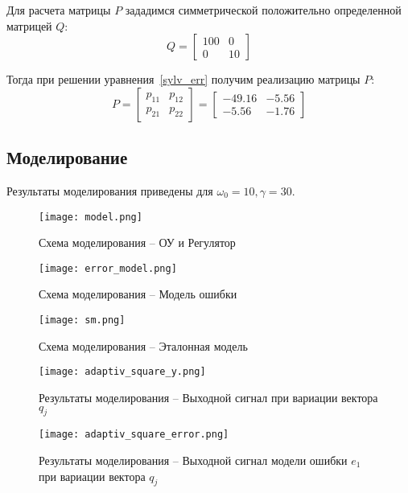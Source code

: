 Для расчета матрицы $P$ зададимся симметрической положительно определенной матрицей $Q$:
\begin{equation}
	Q = 
	\begin{bmatrix}
		100 & 0\\
		0 & 10
	\end{bmatrix}
\end{equation}

Тогда при решении уравнения~\ref{sylv_err} получим реализацию матрицы $P$:
\begin{equation}
	P = 
	\begin{bmatrix}
		p_{11} & p_{12}\\
		p_{21} & p_{22}
	\end{bmatrix}
	=
	\begin{bmatrix}
	  -49.16 & -5.56\\
	-5.56 & -1.76	
	\end{bmatrix}
\end{equation}

\subsection{Моделирование}

Результаты моделирования приведены для $\omega_0 = 10, \gamma = 30$.

\begin{figure}[h!]
	\centering
	\texttt{[image: model.png]}
	\caption{Схема моделирования -- ОУ и Регулятор}
	\label{}
\end{figure}

\begin{figure}[h!]
	\centering
	\texttt{[image: error\_model.png]}
	\caption{Схема моделирования -- Модель ошибки}
	\label{}
\end{figure}
\newpage
\begin{figure}[h!]
	\centering
	\texttt{[image: sm.png]}
	\caption{Схема моделирования -- Эталонная модель}
	\label{}
\end{figure}

\begin{figure}[h!]
	\centering
	\texttt{[image: adaptiv\_square\_y.png]}
	\caption{Результаты моделирования -- Выходной сигнал при вариации вектора $q_j$}
	\label{}
\end{figure}
\newpage
\begin{figure}[h!]
	\centering
	\texttt{[image: adaptiv\_square\_error.png]}
	\caption{Результаты моделирования -- Выходной сигнал модели ошибки $e_1$ при вариации вектора $q_j$}
	\label{}
\end{figure}



\newpage 